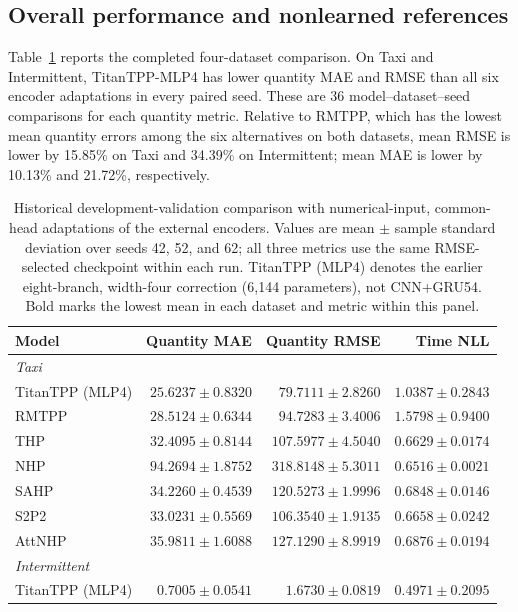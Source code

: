 \documentclass[runningheads]{llncs}
\begin{document}
\subsection{Overall performance and nonlearned references}
Table~\ref{tab:external-legacy} reports the completed four-dataset comparison. On Taxi and Intermittent, TitanTPP-MLP4 has lower quantity MAE and RMSE than all six encoder adaptations in every paired seed. These are 36 model--dataset--seed comparisons for each quantity metric. Relative to RMTPP, which has the lowest mean quantity errors among the six alternatives on both datasets, mean RMSE is lower by 15.85\% on Taxi and 34.39\% on Intermittent; mean MAE is lower by 10.13\% and 21.72\%, respectively.

\begin{table}[p]
\caption{Historical development-validation comparison with numerical-input, common-head adaptations of the external encoders. Values are mean $\pm$ sample standard deviation over seeds 42, 52, and 62; all three metrics use the same RMSE-selected checkpoint within each run. TitanTPP (MLP4) denotes the earlier eight-branch, width-four correction (6,144 parameters), not CNN+GRU54. Bold marks the lowest mean in each dataset and metric within this panel.}
\label{tab:external-legacy}\centering\small
\begin{tabular}{lrrr}
\toprule
Model & Quantity MAE & Quantity RMSE & Time NLL\\
\midrule
\multicolumn{4}{l}{\textit{Taxi}}\\
TitanTPP (MLP4) & $\mathbf{25.6237\pm0.8320}$ & $\mathbf{79.7111\pm2.8260}$ & $1.0387\pm0.2843$\\
RMTPP & $28.5124\pm0.6344$ & $94.7283\pm3.4006$ & $1.5798\pm0.9400$\\
THP & $32.4095\pm0.8144$ & $107.5977\pm4.5040$ & $0.6629\pm0.0174$\\
NHP & $94.2694\pm1.8752$ & $318.8148\pm5.3011$ & $\mathbf{0.6516\pm0.0021}$\\
SAHP & $34.2260\pm0.4539$ & $120.5273\pm1.9996$ & $0.6848\pm0.0146$\\
S2P2 & $33.0231\pm0.5569$ & $106.3540\pm1.9135$ & $0.6658\pm0.0242$\\
AttNHP & $35.9811\pm1.6088$ & $127.1290\pm8.9919$ & $0.6876\pm0.0194$\\
\midrule
\multicolumn{4}{l}{\textit{Intermittent}}\\
TitanTPP (MLP4) & $\mathbf{0.7005\pm0.0541}$ & $\mathbf{1.6730\pm0.0819}$ & $0.4971\pm0.2095$\\

\end{tabular}
\end{table}
\end{document}

